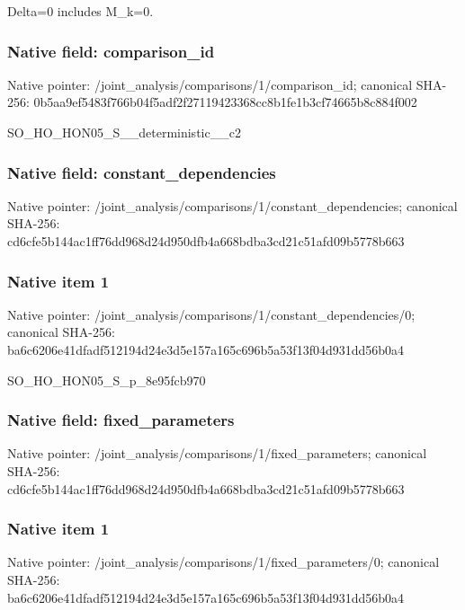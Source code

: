 \documentclass[10pt,a4paper]{article}
\begin{document}
\begingroup\raggedright\sloppy Delta=\allowbreak{}0 includes M\_\allowbreak{}k=\allowbreak{}0.\par\endgroup

\subsubsection{Native field: comparison\_\allowbreak{}id}
Native pointer: /joint\_\allowbreak{}analysis/comparisons/1/comparison\_\allowbreak{}id; canonical SHA-256: 0b5aa9ef5483f766b04f5adf2f27119423368cc8b1fe1b3cf74665b8c884f002

\begingroup\raggedright\sloppy SO\_\allowbreak{}HO\_\allowbreak{}HON05\_\allowbreak{}S\_\allowbreak{}\_\allowbreak{}deterministic\_\allowbreak{}\_\allowbreak{}c2\par\endgroup

\subsubsection{Native field: constant\_\allowbreak{}dependencies}
Native pointer: /joint\_\allowbreak{}analysis/comparisons/1/constant\_\allowbreak{}dependencies; canonical SHA-256: cd6cfe5b144ac1ff76dd968d24d950dfb4a668bdba3cd21c51afd09b5778b663

\subsubsection{Native item 1}
Native pointer: /joint\_\allowbreak{}analysis/comparisons/1/constant\_\allowbreak{}dependencies/0; canonical SHA-256: ba6c6206e41dfadf512194d24e3d5e157a165c696b5a53f13f04d931dd56b0a4

\begingroup\raggedright\sloppy SO\_\allowbreak{}HO\_\allowbreak{}HON05\_\allowbreak{}S\_\allowbreak{}p\_\allowbreak{}8e95fcb970\par\endgroup

\subsubsection{Native field: fixed\_\allowbreak{}parameters}
Native pointer: /joint\_\allowbreak{}analysis/comparisons/1/fixed\_\allowbreak{}parameters; canonical SHA-256: cd6cfe5b144ac1ff76dd968d24d950dfb4a668bdba3cd21c51afd09b5778b663

\subsubsection{Native item 1}
Native pointer: /joint\_\allowbreak{}analysis/comparisons/1/fixed\_\allowbreak{}parameters/0; canonical SHA-256: ba6c6206e41dfadf512194d24e3d5e157a165c696b5a53f13f04d931dd56b0a4
\end{document}
